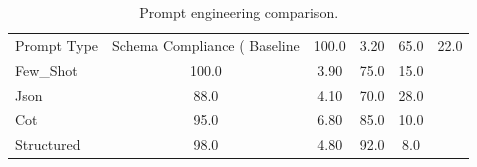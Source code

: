 \begin{table}[htbp]
  \centering
  \caption{Prompt engineering comparison.}
  \label{tab:prompt_engineering}
  \begin{tabular}{lcccc}
    \toprule
    Prompt Type & Schema Compliance (%
    \midrule
    Baseline & 100.0 & 3.20 & 65.0 & 22.0 \\
    Few_Shot & 100.0 & 3.90 & 75.0 & 15.0 \\
    Json & 88.0 & 4.10 & 70.0 & 28.0 \\
    Cot & 95.0 & 6.80 & 85.0 & 10.0 \\
    Structured & 98.0 & 4.80 & 92.0 & 8.0 \\
    \bottomrule
  \end{tabular}
\end{table}
